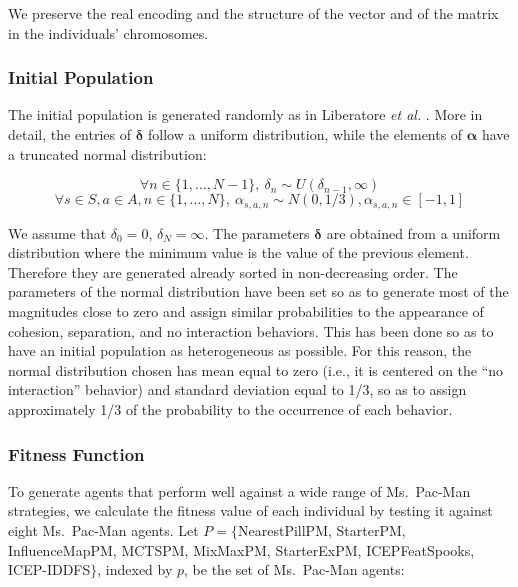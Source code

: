 \documentclass[journal]{IEEEtran}
\begin{document}
We preserve the real encoding and the structure of the vector and of the matrix in the individuals' chromosomes.

\subsubsection{Initial Population}
The initial population is generated randomly as in Liberatore \emph{et al.} \cite{Liberatore2014}. More in detail, the entries of $\boldsymbol\delta$ follow a uniform distribution, while the elements of $\boldsymbol\alpha$ have a truncated normal distribution:

\begin{small}
\begin{equation}
	\label{eq:init_radius}
	\forall n \in \{1, \ldots, N-1\}, \: \delta_n \sim U(\delta_{n-1},\infty)
\end{equation}
\begin{equation}
	\label{eq:init_magnitude}
	\forall s \in S, a \in A,  n \in \{1, \ldots, N\}, \: \alpha_{s,a,n} \sim N(0,1/3), \alpha_{s,a,n} \in [-1,1]
\end{equation}
\end{small}

We assume that $\delta_0 = 0$, $\delta_N = \infty$. The parameters $\boldsymbol\delta$ are obtained from a uniform distribution where the minimum value is the value of the previous element. Therefore they are generated already sorted in non-decreasing order. The parameters of the normal distribution have been set so as to generate most of the magnitudes close to zero and assign similar probabilities to the appearance of cohesion, separation, and no interaction behaviors. This has been done so as to have an initial population as heterogeneous as possible. For this reason, the normal distribution chosen has mean equal to zero (i.e., it is centered on the “no interaction” behavior) and standard deviation equal to 1/3, so as to assign approximately 1/3 of the probability to the occurrence of each behavior.

\subsubsection{Fitness Function}
To generate agents that perform well against a wide range of Ms.\  Pac-Man strategies, we calculate the fitness value of each individual by testing it against eight Ms.\  Pac-Man agents. Let $P=\{$NearestPillPM, StarterPM, InfluenceMapPM, MCTSPM, MixMaxPM, StarterExPM, ICEPFeatSpooks, ICEP-IDDFS$\}$, indexed by $p$, be the set of Ms.\  Pac-Man agents:
\end{document}
